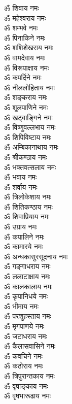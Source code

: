 \begin{multicols}{2}
\begin{flushleft}
ॐ शिवाय नमः\\
ॐ महेश्वराय नमः\\
ॐ शम्भवे नमः\\
ॐ पिनाकिने नमः\\
ॐ शशिशेखराय नमः\\
ॐ वामदेवाय नमः\\
ॐ विरूपाक्षाय नमः\\
ॐ कपर्दिने नमः\\
ॐ नीललोहिताय नमः\\
ॐ शङ्कराय नमः\hfill{}\\
ॐ शूलपाणिने नमः\\
ॐ खट्वाङ्गिने नमः\\
ॐ विष्णुवल्लभाय नमः\\
ॐ शिपिविष्टाय नमः\\
ॐ अम्बिकानाथाय नमः\\
ॐ श्रीकण्ठाय नमः\\
ॐ भक्तवत्सलाय नमः\\
ॐ भवाय नमः\\
ॐ शर्वाय नमः\\
ॐ त्रिलोकेशाय नमः\hfill{}\\
ॐ शितिकण्ठाय नमः\\
ॐ शिवाप्रियाय नमः\\
ॐ उग्राय नमः\\
ॐ कपालिने नमः\\
ॐ कामारये नमः\\
ॐ अन्धकासुरसूदनाय नमः\\
ॐ गङ्गाधराय नमः\\
ॐ ललाटाक्षाय नमः\\
ॐ कालकालाय नमः\\
ॐ कृपानिधये नमः\hfill{}\\
ॐ भीमाय नमः\\
ॐ परशुहस्ताय नमः\\
ॐ मृगपाणये नमः\\
ॐ जटाधराय नमः\\
ॐ कैलासवासिने नमः\\
ॐ कवचिने नमः\\
ॐ कठोराय नमः\\
ॐ त्रिपुरान्तकाय नमः\\
ॐ वृषाङ्काय नमः\\
ॐ वृषभारूढाय नमः\hfill{}\\

\end{flushleft}
\end{multicols}
